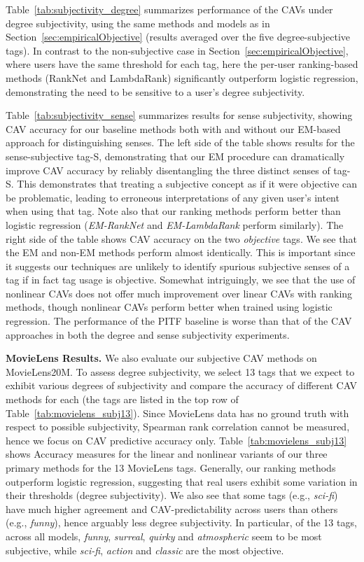 \documentclass[manuscript,screen,nonacm]{acmart}
\newcommand{\1}{{\mathbf 1}}
\theoremstyle{TheoremNum}
\begin{document}
Table~\ref{tab:subjectivity_degree} summarizes performance of the CAVs under degree subjectivity, using the same methods and models as in Section~\ref{sec:empiricalObjective} (results averaged over the five degree-subjective tags).
In contrast to the non-subjective case in Section~\ref{sec:empiricalObjective}, where users have the same threshold for each tag, here the per-user ranking-based methods (RankNet and LambdaRank) significantly outperform logistic regression, demonstrating the need to be sensitive to a user's degree subjectivity.



Table~\ref{tab:subjectivity_sense} summarizes  results for sense subjectivity, showing CAV accuracy for our baseline methods both with and without our EM-based approach for distinguishing senses. The left side of the table shows results for the sense-subjective tag-S, demonstrating that our EM procedure can dramatically improve CAV accuracy by reliably disentangling the three distinct senses of tag-S. This demonstrates that treating a subjective concept as if it were objective can be problematic, leading to erroneous interpretations of any given user's intent when using that tag. Note also that our ranking methods perform better than logistic regression
(\emph{EM-RankNet} and \emph{EM-LambdaRank} perform similarly).
The right side of the table shows CAV accuracy on the two \emph{objective} tags. We see that the EM and non-EM methods perform almost identically. This is important since it suggests our techniques are unlikely to identify spurious subjective senses of a tag if in fact tag usage is objective.
Somewhat intriguingly, we see that the use of nonlinear CAVs does not offer much improvement over linear CAVs with ranking methods, though nonlinear CAVs perform better when trained using logistic regression. The performance of the PITF baseline is worse than that of the CAV approaches in both the degree and sense subjectivity experiments.


\vskip 2mm
\noindent
\textbf{MovieLens Results.} \hspace*{2mm}
We also evaluate our subjective CAV methods on MovieLens20M. To assess degree subjectivity, we select 13 tags that we expect to exhibit various degrees of subjectivity and compare the accuracy of different CAV methods for each (the tags are listed in the top row of Table~\ref{tab:movielens_subj13}). Since MovieLens data has no ground truth with respect to possible subjectivity,
Spearman rank correlation cannot be measured, hence we focus on CAV predictive accuracy only. 
Table~\ref{tab:movielens_subj13} shows Accuracy measures for the linear and nonlinear variants of our three primary methods for the 13 MovieLens tags.
Generally, our ranking methods outperform logistic regression, suggesting that real users exhibit some variation in their thresholds (degree subjectivity). We also see that some tags (e.g., \emph{sci-fi}) have much higher agreement and CAV-predictability across users than others (e.g., \emph{funny}), hence arguably less degree subjectivity.  In particular, of the 13 tags, across all models, \emph{funny}, \emph{surreal}, \emph{quirky} and \emph{atmospheric} seem to be most subjective, while \emph{sci-fi}, \emph{action} and \emph{classic} are the most objective.
\end{document}
